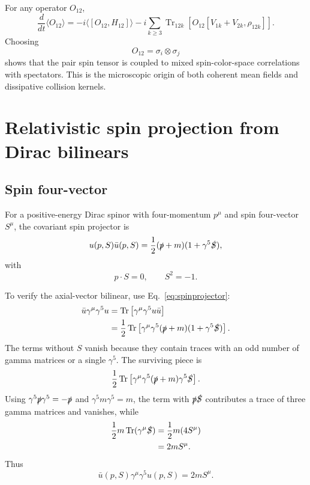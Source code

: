 \documentclass[11pt]{article}
\newcommand{\Trc}{\operatorname{Tr}}
\begin{document}
For any operator $O_{12}$,
\begin{equation}
\frac{d}{dt}\langle O_{12}\rangle
=-i\langle[O_{12},H_{12}]\rangle
-i\sum_{k\ge3}\Trc_{12k}\left[O_{12}[V_{1k}+V_{2k},\rho_{12k}]\right].
\end{equation}
Choosing
\begin{equation}
O_{12}=\sigma_i\otimes\sigma_j
\end{equation}
shows that the pair spin tensor is coupled to mixed spin-color-space correlations with spectators. This is the microscopic origin of both coherent mean fields and dissipative collision kernels.

\section{Relativistic spin projection from Dirac bilinears}

\subsection{Spin four-vector}

For a positive-energy Dirac spinor with four-momentum $p^\mu$ and spin four-vector $S^\mu$, the covariant spin projector is
\begin{equation}
u(p,S)\bar u(p,S)
=\frac12(\slashed p+m)(1+\gamma^5\slashed S),
\label{eq:spinprojector}
\end{equation}
with
\begin{equation}
p\cdot S=0,
\qquad
S^2=-1.
\end{equation}

To verify the axial-vector bilinear, use Eq.~\eqref{eq:spinprojector}:
\begin{align}
\bar u\gamma^\mu\gamma^5u
&=\Trc\left[\gamma^\mu\gamma^5u\bar u\right]\\
&=\frac12\Trc\left[\gamma^\mu\gamma^5(\slashed p+m)(1+\gamma^5\slashed S)\right].
\end{align}
The terms without $S$ vanish because they contain traces with an odd number of gamma matrices or a single $\gamma^5$. The surviving piece is
\begin{align}
\frac12\Trc\left[\gamma^\mu\gamma^5(\slashed p+m)\gamma^5\slashed S\right].
\end{align}
Using $\gamma^5\slashed p\gamma^5=-\slashed p$ and $\gamma^5m\gamma^5=m$, the term with $\slashed p\slashed S$ contributes a trace of three gamma matrices and vanishes, while
\begin{align}
\frac12 m\Trc(\gamma^\mu\slashed S)
&=\frac12m(4S^\mu)\\
&=2mS^\mu.
\end{align}
Thus
\begin{equation}
\boxed{
\bar u(p,S)\gamma^\mu\gamma^5u(p,S)=2mS^\mu.
}
\label{eq:axialbilinear}
\end{equation}
\end{document}
